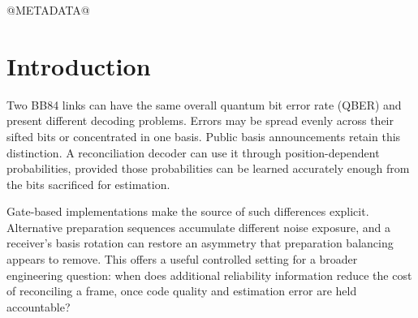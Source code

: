 \begin{abstract}
Public basis labels in BB84 retain reliability information hidden by aggregate quantum bit
error rate. We ask when that information survives estimation and coding costs. Complete
circuit paths explain the asymmetry, including the receiver rotation, while independent
channel noise progressively removes it. A nested LDPC family, pooled-centred shrinkage,
separate calibration data, and 24,000 main holdout frames establish a low-failure operating
regime. When every preparation path is noisy, a matched-code comparison at 10\% target QBER with a stronger
decoder reduces frame errors from 1.40\% to 0.65\% (ratio 0.46; 95\% interval 0.26--0.69).
Balanced paths show no corresponding benefit, and conservative calibration can increase
disclosure despite useful basis information. A complementary equal-budget study compares
noise scaling with independent calibration and a published interception-density estimator.
Wider, analytically selected noise settings improve extrapolation precision; drift and
unscaled channel disturbance expose different limits on interpretation. Together, the
experiments connect circuit exposure, finite-sample reliability, and acquisition design,
providing reproducible engineering guidance for gate-based BB84. Reconciliation yield and
model-based disturbance estimation remain distinct from a secure-key rate.
\end{abstract}
@METADATA@
\maketitle
\raggedbottom

\section{Introduction}
Two BB84 links can have the same overall quantum bit error rate (QBER) and present different
decoding problems. Errors may be spread evenly across their sifted bits or concentrated in
one basis. Public basis announcements retain this distinction. A reconciliation decoder can
use it through position-dependent probabilities, provided those probabilities can be learned
accurately enough from the bits sacrificed for estimation.

Gate-based implementations make the source of such differences explicit. Alternative
preparation sequences accumulate different noise exposure, and a receiver's basis rotation
can restore an asymmetry that preparation balancing appears to remove. This offers a useful
controlled setting for a broader engineering question: when does additional reliability
information reduce the cost of reconciling a frame, once code quality and estimation error
are held accountable?

